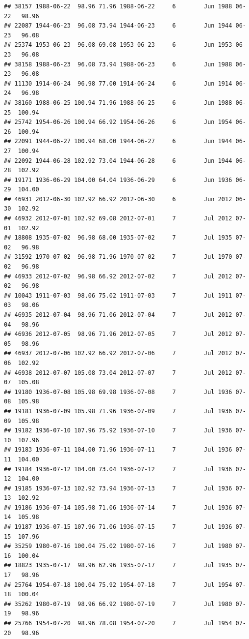 \documentclass{article}\usepackage[]{graphicx}\usepackage[]{color}
\makeatletter
\newenvironment{kframe}{%
 \def\at@end@of@kframe{}%
 \ifinner\ifhmode%
  \def\at@end@of@kframe{\end{minipage}}%
  \begin{minipage}{\columnwidth}%
 \fi\fi%
 \def\FrameCommand##1{\hskip\@totalleftmargin \hskip-\fboxsep
 \colorbox{shadecolor}{##1}\hskip-\fboxsep
     \hskip-\linewidth \hskip-\@totalleftmargin \hskip\columnwidth}%
 \MakeFramed {\advance\hsize-\width
   \@totalleftmargin\z@ \linewidth\hsize
   \@setminipage}}%
 {\par\unskip\endMakeFramed%
 \at@end@of@kframe}
\newenvironment{knitrout}{}{} %
\makeatother
\begin{document}
\begin{knitrout}
\begin{kframe}
\begin{verbatim}
## 38157 1988-06-22  98.96 71.96 1988-06-22     6        Jun 1988 06-22   98.96
## 22087 1944-06-23  96.08 73.94 1944-06-23     6        Jun 1944 06-23   96.08
## 25374 1953-06-23  96.08 69.08 1953-06-23     6        Jun 1953 06-23   96.08
## 38158 1988-06-23  96.08 73.94 1988-06-23     6        Jun 1988 06-23   96.08
## 11130 1914-06-24  96.98 77.00 1914-06-24     6        Jun 1914 06-24   96.98
## 38160 1988-06-25 100.94 71.96 1988-06-25     6        Jun 1988 06-25  100.94
## 25742 1954-06-26 100.94 66.92 1954-06-26     6        Jun 1954 06-26  100.94
## 22091 1944-06-27 100.94 68.00 1944-06-27     6        Jun 1944 06-27  100.94
## 22092 1944-06-28 102.92 73.04 1944-06-28     6        Jun 1944 06-28  102.92
## 19171 1936-06-29 104.00 64.04 1936-06-29     6        Jun 1936 06-29  104.00
## 46931 2012-06-30 102.92 66.92 2012-06-30     6        Jun 2012 06-30  102.92
## 46932 2012-07-01 102.92 69.08 2012-07-01     7        Jul 2012 07-01  102.92
## 18808 1935-07-02  96.98 68.00 1935-07-02     7        Jul 1935 07-02   96.98
## 31592 1970-07-02  96.98 71.96 1970-07-02     7        Jul 1970 07-02   96.98
## 46933 2012-07-02  96.98 66.92 2012-07-02     7        Jul 2012 07-02   96.98
## 10043 1911-07-03  98.06 75.02 1911-07-03     7        Jul 1911 07-03   98.06
## 46935 2012-07-04  98.96 71.06 2012-07-04     7        Jul 2012 07-04   98.96
## 46936 2012-07-05  98.96 71.96 2012-07-05     7        Jul 2012 07-05   98.96
## 46937 2012-07-06 102.92 66.92 2012-07-06     7        Jul 2012 07-06  102.92
## 46938 2012-07-07 105.08 73.04 2012-07-07     7        Jul 2012 07-07  105.08
## 19180 1936-07-08 105.98 69.98 1936-07-08     7        Jul 1936 07-08  105.98
## 19181 1936-07-09 105.98 71.96 1936-07-09     7        Jul 1936 07-09  105.98
## 19182 1936-07-10 107.96 75.92 1936-07-10     7        Jul 1936 07-10  107.96
## 19183 1936-07-11 104.00 71.96 1936-07-11     7        Jul 1936 07-11  104.00
## 19184 1936-07-12 104.00 73.04 1936-07-12     7        Jul 1936 07-12  104.00
## 19185 1936-07-13 102.92 73.94 1936-07-13     7        Jul 1936 07-13  102.92
## 19186 1936-07-14 105.98 71.06 1936-07-14     7        Jul 1936 07-14  105.98
## 19187 1936-07-15 107.96 71.06 1936-07-15     7        Jul 1936 07-15  107.96
## 35259 1980-07-16 100.04 75.02 1980-07-16     7        Jul 1980 07-16  100.04
## 18823 1935-07-17  98.96 62.96 1935-07-17     7        Jul 1935 07-17   98.96
## 25764 1954-07-18 100.04 75.92 1954-07-18     7        Jul 1954 07-18  100.04
## 35262 1980-07-19  98.96 66.92 1980-07-19     7        Jul 1980 07-19   98.96
## 25766 1954-07-20  98.96 78.08 1954-07-20     7        Jul 1954 07-20   98.96

\end{verbatim}
\end{kframe}
\end{knitrout}
\end{document}
